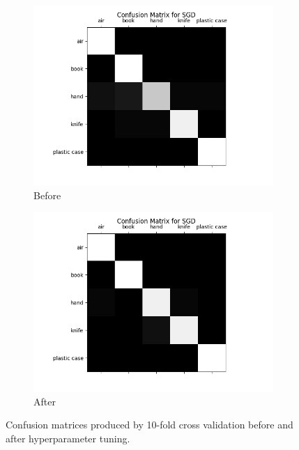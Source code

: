 \documentclass[12pt]{article}
\begin{document}
\begin{figure}[!ht]
\centering
\begin{subfigure}{.5\textwidth}
  \centering
  \includegraphics[width=\linewidth]{images/beforesgd}
	\caption{Before}
  \label{fig:beforesgd}
\end{subfigure}%
\begin{subfigure}{.5\textwidth}
  \centering
  \includegraphics[width=\linewidth]{images/aftersgd}
  \caption{After}
  \label{fig:aftersgd}
\end{subfigure}
\caption{Confusion matrices produced by 10-fold cross validation before and after hyperparameter tuning.}
\label{fig:beforeandaftersgd}
\end{figure}
\end{document}
